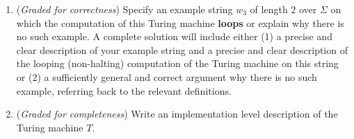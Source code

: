 \documentclass[12pt, oneside]{article}
\newcommand{\gradeCorrect}{({\it Graded for correctness}) }
\newcommand{\gradeComplete}{({\it Graded for completeness}) }
\begin{document}
\begin{enumerate}[wide, labelwidth=!, labelindent=0pt]
\begin{enumerate}
        \item\gradeCorrect Specify an example string $w_3$ of length $2$ over $\Sigma$ 
        on which  the computation of this Turing machine {\bf loops}
        or explain why there is no such 
        example. A complete solution will include either (1) a precise and clear 
        description of your example  string and a precise and clear description of the looping (non-halting) 
        computation
        of the Turing machine on this string or (2) a sufficiently
        general and correct argument why there is no such example, referring back to the relevant definitions.

        \item\gradeComplete Write an implementation level description of 
        the Turing machine $T$.
\end{enumerate}


\end{enumerate}
\end{document}
